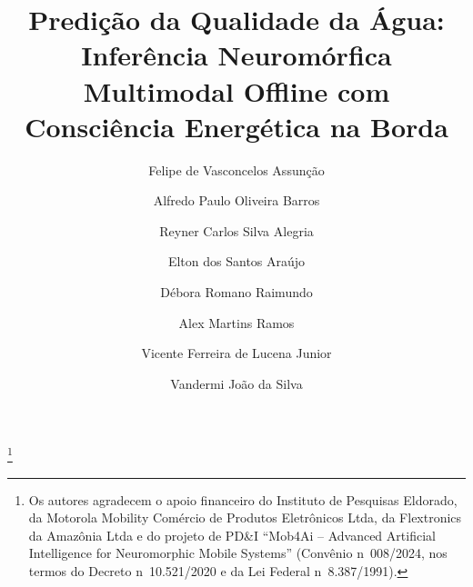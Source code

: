 \documentclass[a4paper]{ifacconf}
\begin{document}
\begin{frontmatter}

\title{Predição da Qualidade da Água: Inferência Neuromórfica Multimodal Offline com Consciência Energética na Borda}

\thanks[footnoteinfo]{Os autores agradecem o apoio financeiro do Instituto de Pesquisas Eldorado, da Motorola Mobility Com\'ercio de Produtos Eletr\^onicos Ltda, da Flextronics da Amaz\^onia Ltda e do projeto de PD\&I ``Mob4Ai -- Advanced Artificial Intelligence for Neuromorphic Mobile Systems'' (Conv\^enio n\textordmasculine~008/2024, nos termos do Decreto n\textordmasculine~10.521/2020 e da Lei Federal n\textordmasculine~8.387/1991).}

\author[UFAM,ELD,PPGCTS]{Felipe de Vasconcelos Assun\c{c}\~ao}
\author[UFAM,PPGCTS]{Alfredo Paulo Oliveira Barros}
\author[UFAM]{Reyner Carlos Silva Alegria}
\author[IND]{Elton dos Santos Ara\'ujo}
\author[ELD]{D\'ebora Romano Raimundo}
\author[UFAM]{Alex Martins Ramos}
\author[UFAM]{Vicente Ferreira de Lucena Junior}
\author[UFAM,PPGCTS]{Vandermi Jo\~ao da Silva}

\address[UFAM]{Universidade Federal do Amazonas (UFAM), Instituto de Ci\^encias Exatas e Tecnologia (ICET), Itacoatiara, Brasil (e-mail: \{felipe.assuncao, alfredo.barros, reyner.alegria, alexmartins, vicente, vandermi\}@ufam.edu.br).}
\address[IND]{Pesquisador Independente, Brasil (e-mail: elton\_araujo\_@hotmail.com).}
\address[ELD]{Instituto de Pesquisas Eldorado, Brasil (e-mail: debora.raimundo@eldorado.org.br, felipe.assuncao@eldorado.org.br).}
\address[PPGCTS]{Programa de P\'os-Gradua\c{c}\~ao em Ci\^encia, Tecnologia e Sa\'ude (PPGCTS), Brasil.}


\end{frontmatter}
\end{document}
